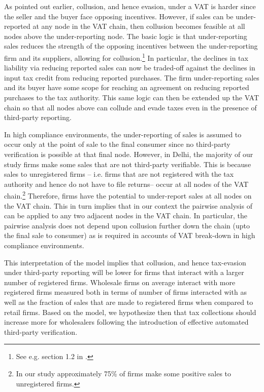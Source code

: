 As pointed out earlier, collusion, and hence evasion, under a VAT is harder since the seller and the buyer face opposing incentives. However, if sales can be under-reported at any node in the VAT chain, then collusion becomes feasible at all nodes above the under-reporting node. The basic logic is that under-reporting sales reduces the
strength of the opposing incentives between the under-reporting firm and its suppliers, allowing for collusion.\footnote{See e.g. section 1.2 in \cite{pomeranz2015no}.} In particular, the declines in tax liability via reducing reported sales can now be traded-off against the declines in input tax credit from reducing reported purchases. The firm under-reporting sales and its buyer have some scope for reaching an agreement on reducing reported purchases to the tax authority. This same logic can then be extended up the VAT chain so that all nodes
above can collude and evade taxes even in the presence of third-party reporting.

In high compliance environments, the under-reporting of sales is assumed to occur only at the point of sale to the final consumer since no third-party verification is possible at that final node. However, in Delhi, the majority of our study firms make some sales that are not third-party verifiable. This is because sales to unregistered firms --
i.e. firms that are not registered with the tax authority and hence do not have to file returns-- occur at all nodes of the VAT chain.\footnote{In our study approximately 75\% of firms make some positive sales to unregistered firms.} Therefore, firms have the potential to under-report sales at all nodes on the VAT chain. This in
turn implies that in our context the pairwise analysis of \cite{kleven2016can} can be applied to any two adjacent nodes in the VAT chain. In particular, the pairwise analysis does not depend upon collusion further down the chain (upto the final sale to consumer) as is required in accounts of VAT break-down in high compliance environments.

This interpretation of the model implies that collusion, and hence tax-evasion under third-party reporting will be lower for firms that interact with a larger number of registered firms. Wholesale firms on average interact with more registered firms measured both in terms of number of firms interacted with as well as the fraction of sales that are made to registered firms when compared to retail firms. Based on the model, we hypothesize then that tax collections should increase more for wholesalers following the introduction of effective automated third-party verification.

